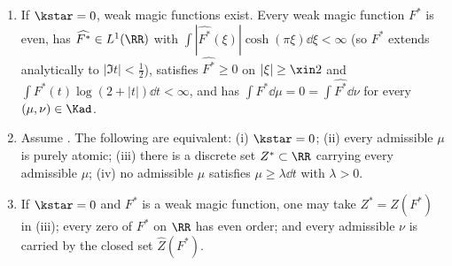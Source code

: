 \begin{theorem}\label{thm:crit}
\begin{enumerate}[label=\textup{(\alph*)}]
\item If $\kstar=0$, weak magic functions exist. Every weak magic function $F^*$ is even, has $\widehat{F^*}\in L^1(\RR)$
with $\int|\widehat{F^*}(\xi)|\cosh(\pi\xi)\dd\xi<\infty$ (so $F^*$ extends analytically to $|\Im t|<\frac12$), satisfies
$\widehat{F^*}\ge0$ on $|\xi|\ge\xin2$ and $\int F^*(t)\log(2+|t|)\dd t<\infty$, and has $\int F^*\dd\mu=0=\int\widehat{F^*}\dd\nu$
for every $(\mu,\nu)\in\Kad$.
\item Assume \condE. The following are equivalent: \textup{(i)} $\kstar=0$; \textup{(ii)} every admissible $\mu$ is purely
atomic; \textup{(iii)} there is a discrete set $Z^*\subset\RR$ carrying every admissible $\mu$; \textup{(iv)} no admissible $\mu$
satisfies $\mu\ge\lambda\dd t$ with $\lambda>0$.
\item If $\kstar=0$ and $F^*$ is a weak magic function, one may take $Z^*=Z(F^*)$ in \textup{(iii)}; every zero of $F^*$ on
$\RR$ has even order; and every admissible $\nu$ is carried by the closed set $\widehat Z(F^*)$.
\end{enumerate}
\end{theorem}

